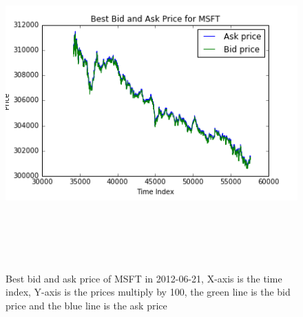 \begin{figure} [hp]
  \begin{center}
    \includegraphics[width=6in,  height=5in]{figures/MSFT_price.png}
  \end{center}
\caption{Best bid and ask price of MSFT in 2012-06-21,    X-axis is the time index,   Y-axis is the prices multiply by 100,   the green line is the bid price and the blue line is the ask price} \label{fig:msft_price}
\end{figure}



